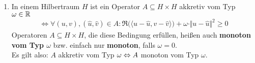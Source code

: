 \begin{beispiel}\
\begin{enumerate}[label=(\alph*)]
\item In einem Hilbertraum $H$ ist ein Operator $A\subseteq H\times H$ akkretiv vom Typ $\omega\in\mathbb{R}$
\begin{align*}
\Longleftrightarrow\forall(u,v),(\hat{u},\hat{v})\in A:
 \Re\big(\langle u-\hat{u},v-\hat{v}\rangle\big)+\omega\cdot\Vert u-\hat{u}\Vert^2\geq0
\end{align*}
Operatoren $A\subseteq H\times H$, die diese Bedingung erfüllen, heißen auch \textbf{monoton vom Typ $\omega$} bzw. einfach nur \textbf{monoton}, falls $\omega=0$.\\
Es gilt also: $A$ akkretiv vom Typ $\omega\Leftrightarrow A$ monoton vom Typ $\omega$.\\


\end{enumerate}
\end{beispiel}
